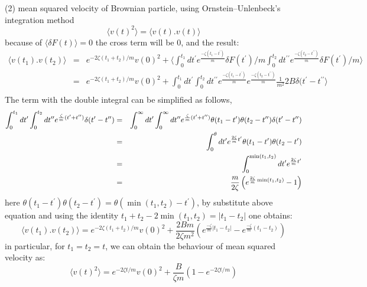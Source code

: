 \documentclass[paper=a4, fontsize=11pt]{scrartcl}
\numberwithin{equation}{section} %
\numberwithin{figure}{section} %
\numberwithin{table}{section} %
\begin{document}
(2) mean squared velocity of Brownian particle, using Ornstein\---Unlenbeck's integration method
\begin{equation*}
\langle v(t)^2 \rangle = \langle v(t).v(t) \rangle
\end{equation*}
because of $\langle \delta F (t) \rangle = 0$ the cross term will be 0, and the result:
\begin{eqnarray*}
\langle v(t_1).v(t_2) \rangle &=& e^{-2\zeta (t_1 + t_2)/m}v(0)^2 + \langle \int_0^{t_1} dt^\prime e^{\frac{-\zeta(t_1 - t^\prime)}{m}} \delta F(t^\prime)/m \int_0^{t_2} dt^{\prime\prime} e^{\frac{-\zeta(t_2 - t^{\prime\prime})}{m}}  \delta F(t^\prime) /m \rangle \\
&=& e^{-2\zeta (t_1 + t_2)/m}v(0)^2 + \int_0^{t_1} dt^\prime \int_0^{t_2} dt^{\prime\prime} e^{\frac{-\zeta(t_1 - t^\prime)}{m}} e^{\frac{-\zeta(t_2 - t^{\prime\prime})}{m}}  \frac{1}{m^2} 2B\delta(t^\prime - t^{\prime\prime} \rangle \\
\end{eqnarray*}
The term with the double integral can be simplified as follows,
\begin{eqnarray*}
\small
\int_0^{t_1} dt^\prime \int_0^{t_2} dt^{\prime\prime} e^{\frac{\zeta}{m}(t^\prime + t^{\prime\prime})} \delta(t^\prime - t^{\prime\prime}) &=& \int_0^{\infty} dt^\prime \int_0^{\infty} dt^{\prime\prime} e^{\frac{\zeta}{m}(t^\prime + t^{\prime\prime})} \theta(t_1 - t^\prime)\theta(t_2 - t^{\prime\prime}) \delta (t^\prime - t^{\prime\prime})\\
&=& \int_0^{\theta} dt^{\prime} e^{\frac{2\zeta}{m}t^\prime} \theta(t_1 - t^\prime) \theta(t_2 - t^\prime)\\
&=& \int_0^{\min(t_1, t_2)} dt^{\prime} e^{\frac{2\zeta}{m} t^\prime}\\
&=& \frac{m}{2\zeta} \left(e^{\frac{2\zeta}{m}\min(t_1, t_2)} - 1 \right)\\
\end{eqnarray*}
here $\theta(t_1 - t^\prime) \theta(t_2 - t^\prime) = \theta(\min(t_1, t_2) - t^\prime)$, by substitute above equation and using the identity $t_1 + t_2 - 2\min(t_1, t_2) = \vert t_1 - t_2 \vert$ one obtains:
\begin{equation*}
\langle v(t_1).v(t_2) \rangle = e^{-2\zeta (t_1 + t_2)/m}v(0)^2 + \frac{2Bm}{2\zeta m^2}(e^{\frac{-\zeta}{m}\vert t_1 - t_2 \vert} - e^{\frac{-\zeta}{m}(t_1 - t_2)})
\end{equation*}
in particular, for $t_1 = t_2 = t$, we can obtain the behaviour of mean squared velocity as:
\begin{equation*}
\langle v(t)^2 \rangle = e^{-2 \zeta t/m}v(0)^2 + \frac{B}{\zeta m} \left(1-e^{-2\zeta t/m} \right)
\end{equation*}\\
\end{document}
